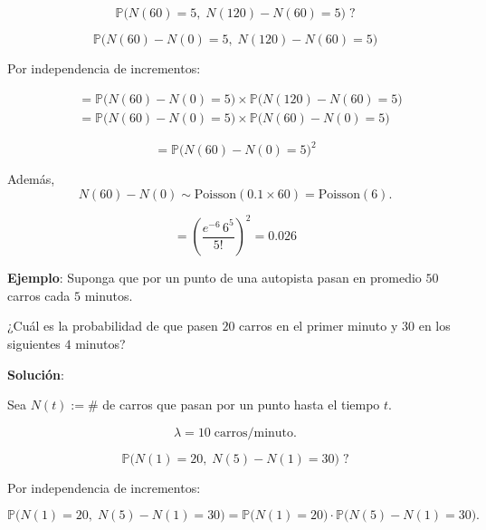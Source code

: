 \documentclass[12pt,a4paper]{article}
\begin{document}
\begin{equation*}
\mathbb{P}\big(N(60) = 5,\; N(120) - N(60) = 5\big)\; ?
\end{equation*}

\begin{equation*}
\mathbb{P}\big(N(60) - N(0) = 5,\; N(120) - N(60) = 5\big)
\end{equation*}

Por independencia de incrementos:

\begin{align*}
&= \mathbb{P}\big(N(60) - N(0) = 5\big) \times \mathbb{P}\big(N(120) - N(60) = 5\big) \\
&= \mathbb{P}\big(N(60) - N(0) = 5\big) \times \mathbb{P}\big(N(60) - N(0) = 5\big)
\end{align*}

\begin{equation*}
= \mathbb{P}\big(N(60) - N(0) = 5\big)^2
\end{equation*}

Además,
\begin{equation*}
N(60) - N(0) \sim \text{Poisson}(0.1 \times 60) = \text{Poisson}(6).
\end{equation*}

\begin{equation*}
= \left( \frac{e^{-6} \, 6^5}{5!} \right)^2 = 0.026
\end{equation*}

\textbf{Ejemplo}: Suponga que por un punto de una autopista pasan en promedio $50$ carros cada $5$ minutos.  

¿Cuál es la probabilidad de que pasen $20$ carros en el primer minuto y $30$ en los siguientes $4$ minutos?

\textbf{Solución}:

Sea $N(t) := \#$ de carros que pasan por un punto hasta el tiempo $t$.

\begin{equation*}
\lambda = 10 \; \text{carros/minuto}.
\end{equation*}

\begin{equation*}
\mathbb{P}\big(N(1)=20,\; N(5)-N(1)=30\big)\; ?
\end{equation*}

Por independencia de incrementos:

\begin{equation*}
\mathbb{P}\big(N(1)=20,\; N(5)-N(1)=30\big)
= \mathbb{P}\big(N(1)=20\big)\cdot \mathbb{P}\big(N(5)-N(1)=30\big).
\end{equation*}
\end{document}
